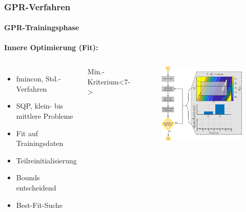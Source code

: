 \documentclass{beamer}
\begin{document}
\begin{frame}
\frametitle{GPR-Verfahren}
\framesubtitle{GPR-Trainingsphase}
\textbf{Innere Optimierung (Fit):}
\begin{columns}[c]
	\begin{itemize}
		\item<2-> fmincon, Std.-Verfahren
		\item<2-> SQP, klein- bis mittlere Probleme
		\item<3-> Fit auf Trainingsdaten
		\item<4-> Teilreinitialisierung
		\item<5-> Bounds entscheidend
		\item<6-> Best-Fit-Suche
	\end{itemize}
	\begin{block}{Min.-Kriterium}<7->
	\end{block}			

	\begin{figure}
		\begin{overprint}
			\includegraphics[width=\linewidth]{images/Kernel_Tuning}
		\end{overprint}
	\end{figure}
\end{columns}
\end{frame}
\end{document}
